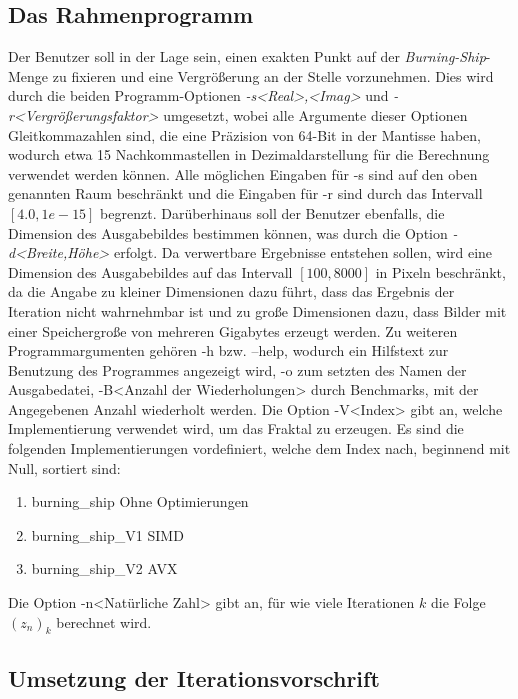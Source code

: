 \documentclass[course=erap]{aspdoc}
\begin{document}
\subsection{Das Rahmenprogramm}
Der Benutzer soll in der Lage sein, einen exakten Punkt auf der \emph{Burning-Ship}-Menge zu fixieren und eine Vergrößerung an der Stelle vorzunehmen. Dies wird durch die beiden Programm-Optionen \emph{-s<Real>,<Imag>} und \emph{-r<Vergrößerungsfaktor>} umgesetzt, wobei alle Argumente dieser Optionen Gleitkommazahlen sind, die eine Präzision von 64-Bit in der Mantisse haben, wodurch etwa 15 Nachkommastellen in Dezimaldarstellung für die Berechnung verwendet werden können. Alle möglichen Eingaben für -s sind auf den oben genannten Raum beschränkt und die Eingaben für -r sind durch das Intervall $[4.0, 1e-15]$ begrenzt. Darüberhinaus soll der Benutzer ebenfalls, die Dimension des Ausgabebildes bestimmen können, was durch die Option \emph{-d<Breite,Höhe>} erfolgt. Da verwertbare Ergebnisse entstehen sollen, wird eine Dimension des Ausgabebildes auf das Intervall $[100, 8000]$ in Pixeln beschränkt, da die Angabe zu kleiner Dimensionen dazu führt, dass das Ergebnis der Iteration nicht wahrnehmbar ist und zu große Dimensionen dazu, dass Bilder mit einer Speichergroße von mehreren Gigabytes erzeugt werden. Zu weiteren Programmargumenten gehören -h bzw. --help, wodurch ein Hilfstext zur Benutzung des Programmes angezeigt wird, -o zum setzten des Namen der Ausgabedatei, -B<Anzahl der Wiederholungen> durch Benchmarks, mit der Angegebenen Anzahl wiederholt werden. Die Option -V<Index> gibt an, welche Implementierung verwendet wird, um das Fraktal zu erzeugen. Es sind die folgenden Implementierungen vordefiniert, welche dem Index nach, beginnend mit Null, sortiert sind:
\begin{enumerate}
    \item burning\_ship \textemdash \; Ohne Optimierungen
    \item burning\_ship\_V1 \textemdash \; SIMD
    \item burning\_ship\_V2 \textemdash \; AVX
\end{enumerate}
Die Option -n<Natürliche Zahl> gibt an, für wie viele Iterationen $k$ die Folge $(z_{n})_{k}$ berechnet wird.


\subsection{Umsetzung der Iterationsvorschrift}
\end{document}
